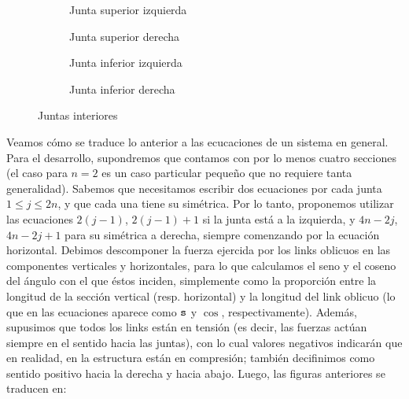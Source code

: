 \begin{figure}[!ht]
        \centering
        \begin{subfigure}[b]{0.24\textwidth}
                
                \caption{Junta superior izquierda}
                \label{fig:juntasupizq}
        \end{subfigure}
        \begin{subfigure}[b]{0.24\textwidth}
                
                \caption{Junta superior derecha}
                \label{fig:juntasupder}
        \end{subfigure}
        \begin{subfigure}[b]{0.24\textwidth}
                
                \caption{Junta inferior izquierda}
                \label{fig:juntainfizq}
        \end{subfigure}
        \begin{subfigure}[b]{0.24\textwidth}
                
                \caption{Junta inferior derecha}
                \label{fig:juntainfder}
        \end{subfigure}
        \caption{Juntas interiores}\label{fig:juntasInt}
\end{figure}

Veamos cómo se traduce lo anterior a las ecucaciones de un sistema en general. Para el desarrollo, supondremos que contamos con por lo menos cuatro secciones (el caso para $n = 2$ es un caso particular pequeño que no requiere tanta generalidad). Sabemos que necesitamos escribir dos ecuaciones por cada junta $1 \leq j \leq 2n$, y que cada una tiene su simétrica. Por lo tanto, proponemos utilizar las ecuaciones $2(j-1)$, $2(j-1)+1$ si la junta está a la izquierda, y $4n-2j$, $4n-2j+1$ para su simétrica a derecha, siempre comenzando por la ecuación horizontal. Debimos descomponer la fuerza ejercida por los links oblicuos en las componentes verticales y horizontales, para lo que calculamos el seno y el coseno del ángulo con el que éstos inciden, simplemente como la proporción entre la longitud de la sección vertical (resp. horizontal) y la longitud del link oblicuo (lo que en las ecuaciones aparece como $\mathtt{s}$ y $\cos$, respectivamente). Además, supusimos que todos los links están en tensión (es decir, las 
fuerzas actúan siempre en el sentido hacia las juntas), con lo cual valores negativos indicarán que en realidad, en la estructura están en compresión; también decifinimos como sentido positivo hacia la derecha y hacia abajo. Luego, las figuras anteriores se traducen en:

